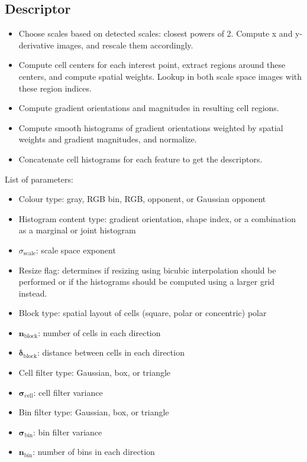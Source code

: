 \documentclass[thesis.tex]{subfiles}
\begin{document}
\subsection{Descriptor}
%
\begin{itemize}
\item Choose scales based on detected scales: closest powers of 2. Compute x and y-derivative images, and rescale them accordingly.
\item Compute cell centers for each interest point, extract regions around these centers, and compute spatial weights. Lookup in both scale space images with these region indices.
\item Compute gradient orientations and magnitudes in resulting cell regions.
\item Compute smooth histograms of gradient orientations weighted by spatial weights and gradient magnitudes, and normalize.
\item Concatenate cell histograms for each feature to get the descriptors.
\end{itemize}
%
List of parameters:
%
\begin{itemize}
\item Colour type: gray, RGB bin, RGB, opponent, or Gaussian opponent
\item Histogram content type: gradient orientation, shape index, or a combination as a marginal or joint histogram
\item $\sigma_{\text{scale}}$: scale space exponent
\item Resize flag: determines if resizing using bicubic interpolation should be performed or if the histograms should be computed using a larger grid instead.
\item Block type: spatial layout of cells (square, polar or concentric)
polar
\item $\mathbf{n}_{\text{block}}$: number of cells in each direction
\item $\boldsymbol\delta_{\text{block}}$: distance between cells in each direction
\item Cell filter type: Gaussian, box, or triangle
\item $\boldsymbol\sigma_{\text{cell}}$: cell filter variance
\item Bin filter type: Gaussian, box, or triangle
\item $\boldsymbol\sigma_{\text{bin}}$: bin filter variance
\item $\mathbf{n}_\text{bin}$: number of bins in each direction
\end{itemize}
%
\end{document}
